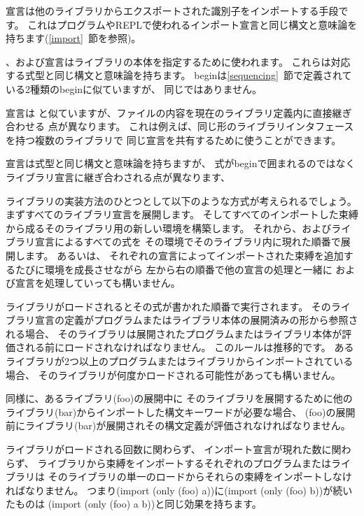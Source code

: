 宣言は他のライブラリからエクスポートされた識別子をインポートする手段です。
これはプログラムやREPLで使われるインポート宣言と同じ構文と意味論を持ちます(\ref{import}~節を参照)。

、および宣言はライブラリの本体を指定するために使われます。
これらは対応する式型と同じ構文と意味論を持ちます。
{\cf begin}は\ref{sequencing}~節で定義されている2種類の{\cf begin}に似ていますが、
同じではありません。

宣言は
と似ていますが、ファイルの内容を現在のライブラリ定義内に直接継ぎ合わせる
点が異なります。
これは例えば、同じ形のライブラリインタフェースを持つ複数のライブラリで
同じ宣言を共有するために使うことができます。

宣言は式型と同じ構文と意味論を持ちますが、
式が{\cf begin}で囲まれるのではなくライブラリ宣言に継ぎ合わされる点が異なります、


ライブラリの実装方法のひとつとして以下のような方式が考えられるでしょう。
まずすべてのライブラリ宣言を展開します。
そしてすべてのインポートした束縛から成るそのライブラリ用の新しい環境を構築します。
それから、およびライブラリ宣言によるすべての式を
その環境でそのライブラリ内に現れた順番で展開します。
あるいは、
それぞれの宣言によってインポートされた束縛を追加するたびに環境を成長させながら
左から右の順番で他の宣言の処理と一緒に
および宣言を処理していっても構いません。

ライブラリがロードされるとその式が書かれた順番で実行されます。
そのライブラリ宣言の定義がプログラムまたはライブラリ本体の展開済みの形から参照される場合、
そのライブラリは展開されたプログラムまたはライブラリ本体が評価される前にロードされなければなりません。
このルールは推移的です。
あるライブラリが2つ以上のプログラムまたはライブラリからインポートされている場合、
そのライブラリが何度かロードされる可能性があっても構いません。

同様に、あるライブラリ{\cf (foo)}の展開中に
そのライブラリを展開するために他のライブラリ{\cf (bar)}からインポートした構文キーワードが必要な場合、
{\cf (foo)}の展開前にライブラリ{\cf (bar)}が展開されその構文定義が評価されなければなりません。

ライブラリがロードされる回数に関わらず、
インポート宣言が現れた数に関わらず、
ライブラリから束縛をインポートするそれぞれのプログラムまたはライブラリは
そのライブラリの単一のロードからそれらの束縛をインポートしなければなりません。
つまり{\cf (import (only (foo) a))}に{\cf (import (only (foo) b))}が続いたものは
{\cf (import (only (foo) a b))}と同じ効果を持ちます。

